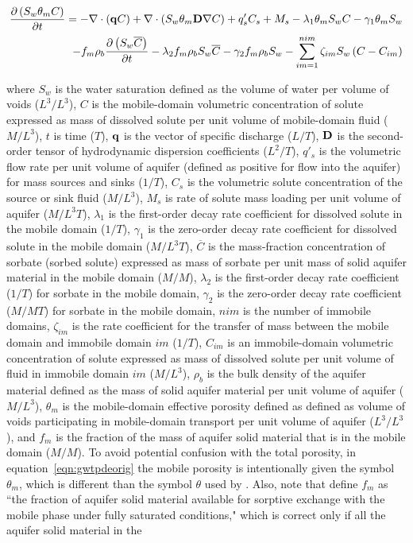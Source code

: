 \begin{equation}
\label{eqn:gwtpdeorig}
\begin{aligned}
\frac {\partial \left ( S_w \theta_m C \right )}{\partial t} = 
- \nabla \cdot \left ( \mathbf{q} C  \right ) 
+ \nabla \cdot \left ( S_w \theta_m \mathbf{D} \nabla C \right ) 
+ q'_s C_s + M_s  
- \lambda_1 \theta_m S_w C - \gamma_1 \theta_m S_w \\
- f_m \rho_b \frac {\partial \left ( S_w \overline{C} \right ) }{\partial t} 
- \lambda_2 f_m \rho_b S_w \overline{C} - \gamma_2 f_m \rho_b S_w 
- \sum \limits_{im=1}^{nim}  \zeta_{im} S_w \left ( C - C_{im} \right )
\end{aligned}
\end{equation}

\noindent where $S_w$ is the water saturation defined as the volume of water per volume of voids ($L^3/L^3$), $C$ is the mobile-domain volumetric concentration of solute expressed as mass of dissolved solute per unit volume of mobile-domain fluid ($M/L^3$), $t$ is time ($T$), $\mathbf{q}$ is the vector of specific discharge ($L/T$), $\mathbf{D}$ is the second-order tensor of hydrodynamic dispersion coefficients ($L^2/T$), $q'_s$ is the volumetric flow rate per unit volume of aquifer (defined as positive for flow into the aquifer) for mass sources and sinks ($1/T$), $C_s$ is the volumetric solute concentration of the source or sink fluid ($M/L^3$), $M_s$ is rate of solute mass loading per unit volume of aquifer ($M/L^3T$), $\lambda_1$ is the first-order decay rate coefficient for dissolved solute in the mobile domain ($1/T$), $\gamma_1$ is the zero-order decay rate coefficient for dissolved solute in the mobile domain ($M/L^3T$), $\overline{C}$ is the mass-fraction concentration of sorbate (sorbed solute) expressed as mass of sorbate per unit mass of solid aquifer material in the mobile domain ($M/M$), $\lambda_2$ is the first-order decay rate coefficient ($1/T$) for sorbate in the mobile domain, $\gamma_2$ is the zero-order decay rate coefficient ($M/MT$) for sorbate in the mobile domain, $nim$ is the number of immobile domains, $\zeta_{im}$ is the rate coefficient for the transfer of mass between the mobile domain and immobile domain $im$ ($1/T$), $C_{im}$ is an immobile-domain volumetric concentration of solute expressed as mass of dissolved solute per unit volume of fluid in immobile domain $im$ ($M/L^3$), $\rho_{b}$ is the bulk density of the aquifer material defined as the mass of solid aquifer material per unit volume of aquifer ($M/L^3$), $\theta_m$ is the mobile-domain effective porosity defined as defined as volume of voids participating in mobile-domain transport per unit volume of aquifer ($L^3/L^3$), and $f_m$ is the fraction of the mass of aquifer solid material that is in the mobile domain ($M/M$). To avoid potential confusion with the total porosity, in equation~\ref{eqn:gwtpdeorig} the mobile porosity is intentionally given the symbol $\theta_m$, which is different than the symbol $\theta$ used by \cite{modflow6gwt}. Also, note that \cite{modflow6gwt} define $f_m$ as ``the fraction of aquifer solid material available for sorptive exchange with the mobile phase under fully saturated conditions," which is correct only if all the aquifer solid material in the 